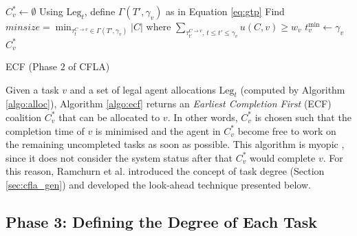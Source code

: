 \begin{algorithm}[t]
  \DontPrintSemicolon
  $C^*_v \gets \emptyset$ \;
  Using $\text{Leg}_t$, define $\Gamma(T', \gamma_v)$ as in Equation \ref{eq:gtp}\;
  \;
  Find $minsize = \min_{\tau_t^{C \to v} \in \Gamma(T', \gamma_v)} |C|$ where
  $\sum_{\tau_{t'}^{C \to v} \text{, } t \leq t' \leq \gamma_v} u(C, v) \geq w_v$\;
  $t^{\min}_v \gets \gamma_v$\;
  \;
  \Return $C^*_v$\;
  \caption{\textsf{ECF} (Phase $2$ of CFLA)\label{algo:ecf}}
\end{algorithm}

Given a task $v$ and a set of legal agent allocations $\text{Leg}_t$ (computed by Algorithm
\ref{algo:alloc}), Algorithm \ref{algo:ecf} returns an \emph{Earliest Completion First}
(ECF) coalition $C^*_v$ that can be allocated to $v$. In other words, $C^*_v$ is chosen
such that the completion time of $v$ is minimised and the agent in $C^*_v$ become free to
work on the remaining uncompleted tasks as soon as possible. This algorithm is myopic
\cite[Section $6.1$]{ramchurn2010cfstp}, since it does not consider the system status
after that $C^*_v$ would complete $v$. For this reason, Ramchurn et al. introduced the
concept of task degree (Section \ref{sec:cfla_gen}) and developed the look-ahead technique
presented below.

\subsection{Phase 3: Defining the Degree of Each Task}\label{sec:cfla3}


